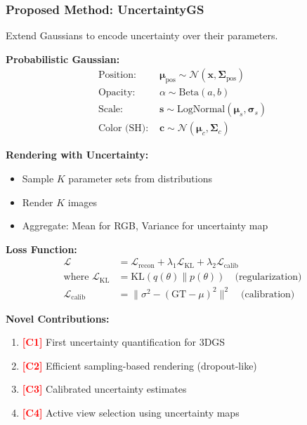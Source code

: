 \documentclass[11pt,letterpaper]{article}
\newcommand{\method}[1]{\textbf{#1}}
\newcommand{\contribution}[1]{\textcolor{red}{\textbf{[#1]}}}
\begin{document}
\subsubsection{Proposed Method: \method{UncertaintyGS}}

Extend Gaussians to encode uncertainty over their parameters.

\textbf{Probabilistic Gaussian:}
\begin{align*}
\text{Position: } &\boldsymbol{\mu}_{\text{pos}} \sim \mathcal{N}(\mathbf{x}, \boldsymbol{\Sigma}_{\text{pos}}) \\
\text{Opacity: } &\alpha \sim \text{Beta}(a, b) \\
\text{Scale: } &\mathbf{s} \sim \text{LogNormal}(\boldsymbol{\mu}_s, \boldsymbol{\sigma}_s) \\
\text{Color (SH): } &\mathbf{c} \sim \mathcal{N}(\boldsymbol{\mu}_c, \boldsymbol{\Sigma}_c)
\end{align*}

\textbf{Rendering with Uncertainty:}
\begin{itemize}[leftmargin=*]
    \item Sample $K$ parameter sets from distributions
    \item Render $K$ images
    \item Aggregate: Mean for RGB, Variance for uncertainty map
\end{itemize}

\textbf{Loss Function:}
\begin{align*}
\mathcal{L} &= \mathcal{L}_{\text{recon}} + \lambda_1 \mathcal{L}_{\text{KL}} + \lambda_2 \mathcal{L}_{\text{calib}} \\
\text{where } \mathcal{L}_{\text{KL}} &= \text{KL}(q(\theta) \| p(\theta)) \quad \text{(regularization)} \\
\mathcal{L}_{\text{calib}} &= \| \sigma^2 - (\text{GT} - \mu)^2 \|^2 \quad \text{(calibration)}
\end{align*}

\textbf{Novel Contributions:}
\begin{enumerate}[leftmargin=*]
    \item \contribution{C1} First uncertainty quantification for 3DGS
    \item \contribution{C2} Efficient sampling-based rendering (dropout-like)
    \item \contribution{C3} Calibrated uncertainty estimates
    \item \contribution{C4} Active view selection using uncertainty maps
\end{enumerate}
\end{document}
